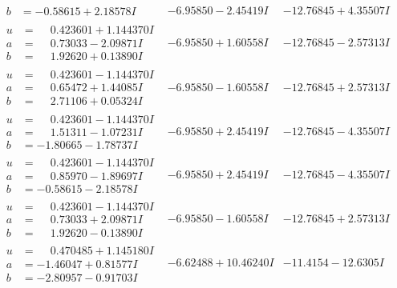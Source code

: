 \documentclass[1p]{elsarticle_modified}
\theoremstyle{definition}
\begin{document}
$$\begin{array}{c|c|c}
\begin{aligned}
b &= -0.58615 + 2.18578 I\end{aligned}
 & -6.95850 - 2.45419 I & -12.76845 + 4.35507 I \\ \hline\begin{aligned}
u &= \phantom{-}0.423601 + 1.144370 I \\
a &= \phantom{-}0.73033 - 2.09871 I \\
b &= \phantom{-}1.92620 + 0.13890 I\end{aligned}
 & -6.95850 + 1.60558 I & -12.76845 - 2.57313 I \\ \hline\begin{aligned}
u &= \phantom{-}0.423601 - 1.144370 I \\
a &= \phantom{-}0.65472 + 1.44085 I \\
b &= \phantom{-}2.71106 + 0.05324 I\end{aligned}
 & -6.95850 - 1.60558 I & -12.76845 + 2.57313 I \\ \hline\begin{aligned}
u &= \phantom{-}0.423601 - 1.144370 I \\
a &= \phantom{-}1.51311 - 1.07231 I \\
b &= -1.80665 - 1.78737 I\end{aligned}
 & -6.95850 + 2.45419 I & -12.76845 - 4.35507 I \\ \hline\begin{aligned}
u &= \phantom{-}0.423601 - 1.144370 I \\
a &= \phantom{-}0.85970 - 1.89697 I \\
b &= -0.58615 - 2.18578 I\end{aligned}
 & -6.95850 + 2.45419 I & -12.76845 - 4.35507 I \\ \hline\begin{aligned}
u &= \phantom{-}0.423601 - 1.144370 I \\
a &= \phantom{-}0.73033 + 2.09871 I \\
b &= \phantom{-}1.92620 - 0.13890 I\end{aligned}
 & -6.95850 - 1.60558 I & -12.76845 + 2.57313 I \\ \hline\begin{aligned}
u &= \phantom{-}0.470485 + 1.145180 I \\
a &= -1.46047 + 0.81577 I \\
b &= -2.80957 - 0.91703 I\end{aligned}
 & -6.62488 + 10.46240 I & -11.4154 - 12.6305 I \\ \hline\begin{aligned}

\end{aligned}
\end{array}$$
\end{document}
